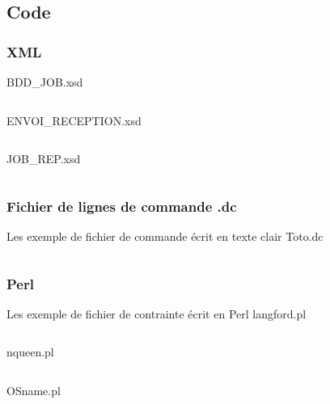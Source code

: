 \documentclass[11pt]{article}
\begin{document}
\newpage
\subsection{Code}
\subsubsection{XML} 

BDD\_JOB.xsd
\inputminted[tabsize=2,frame=lines,linenos]{XML}{../Schema_XML/BDD_JOB.xsd}

ENVOI\_RECEPTION.xsd
\inputminted[tabsize=2,frame=lines,linenos]{XML}{../Schema_XML/ENVOI_RECEPTION.xsd}
\newpage
JOB\_REP.xsd
\inputminted[tabsize=2,frame=lines,linenos]{XML}{../Schema_XML/JOB_REP.xsd}
\newpage
\subsubsection{Fichier de lignes de commande .dc}
Les exemple de fichier de commande écrit en texte clair 
Toto.dc
\inputminted[tabsize=2,frame=lines,linenos]{Perl}{../Echantillon_Script_Cmd/Toto.dc}
\subsubsection{Perl}
Les exemple de fichier de contrainte écrit en Perl 
langford.pl
\inputminted[tabsize=2,frame=lines,linenos]{Perl}{../Echantillon_Script_Perl/langford.pl}

nqueen.pl
\inputminted[tabsize=2,frame=lines,linenos]{Perl}{../Echantillon_Script_Perl/nqueen.pl}
OSname.pl
\inputminted[tabsize=2,frame=lines,linenos]{Perl}{../Echantillon_Script_Perl/OSname.pl}
\end{document}
